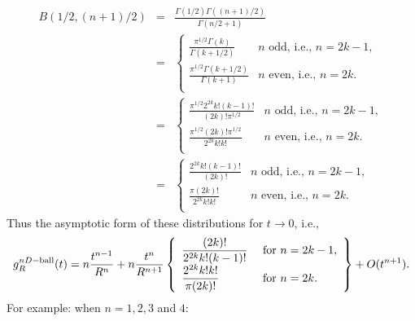 \documentclass{article}
\begin{document}
\begin{eqnarray}
  \label{eq:beta_specified_vals}
  B(1/2,(n+1)/2) & = & \frac{\Gamma(1/2) \Gamma((n+1)/2)}{\Gamma(n/2 + 1)} \nonumber \\
  & = & \left\{ \begin{array}{ll}
      \displaystyle \frac{\pi^{1/2} \Gamma(k)}{\Gamma(k+1/2)} & n \mbox{ odd, i.e., } n=2k-1,\\
      \displaystyle \frac{\pi^{1/2} \Gamma(k+ 1/2)}{\Gamma(k + 1)} & n \mbox{ even, i.e., } n=2k.\\
    \end{array} \right. \nonumber \\
  & = & \left\{ \begin{array}{ll}
      \displaystyle \frac{\pi^{1/2} 2^{2k} k! (k-1)!}{(2k)! \pi^{1/2}} & n \mbox{ odd, i.e., } n=2k-1,\\
      \displaystyle \frac{\pi^{1/2} (2k)! \pi^{1/2}}{2^{2k} k! k!} & n \mbox{ even, i.e., } n=2k.\\
    \end{array} \right. \nonumber \\
  & = & \left\{ \begin{array}{ll}
      \displaystyle \frac{2^{2k} k! (k-1)!}{(2k)! } & n \mbox{ odd, i.e., } n=2k-1,\\
      \displaystyle \frac{\pi (2k)!}{2^{2k} k! k!} & n \mbox{ even, i.e., } n=2k.\\
    \end{array} \right.
\end{eqnarray}
Thus the asymptotic form of these distributions for $t
\rightarrow 0$, i.e., 
\begin{equation}
  \label{eq:asympt_line_picking}
  g^{nD-{\rm ball}}_R(t) = n \frac{t^{n-1}}{R^n} + 
    n \frac{t^{n}}{R^{n+1}} 
   \left\{ \begin{array}{ll}
      \displaystyle 
           \frac{(2k)! }{2^{2k} k! (k-1)!} & \mbox{ for } n=2k-1,\\
      \displaystyle 
           \frac{2^{2k} k! k!}{\pi (2k)!} & \mbox{ for } n=2k.\\
    \end{array} \right\}
 +  O(t^{n+1}).
\end{equation}
For example: when $n=1,2,3$ and $4$:
\end{document}
